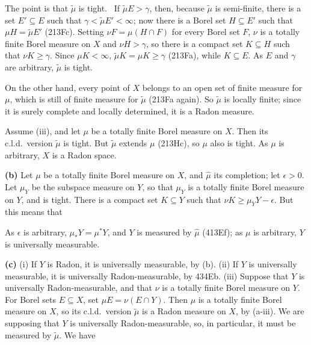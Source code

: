 {\medskip

 The point is that $\tilde\mu$ is tight.
\Prf\ If
$\tilde\mu E>\gamma$, then, because $\tilde\mu$ is semi-finite, there is
a set $E'\subseteq E$ such that $\gamma<\tilde\mu E'<\infty$;  now there
is a Borel set $H\subseteq E'$ such that $\mu H=\tilde\mu E'$ (213Fc).
Setting $\nu F=\mu(H\cap F)$ for every Borel set $F$, $\nu$ is a totally
finite Borel measure on $X$ and $\nu H>\gamma$, so there is a compact
set $K\subseteq H$ such that $\nu K\ge\gamma$.   Since
$\mu K<\infty$, $\tilde\mu K=\mu K\ge\gamma$ (213Fa), while
$K\subseteq E$.   As $E$ and $\gamma$ are arbitrary, $\tilde\mu$ is tight.\ \Qed

On the other hand, every point of $X$ belongs to an open set of finite
measure for $\mu$, which is still of finite measure for $\tilde\mu$
(213Fa again).   So $\tilde\mu$ is locally finite;  since it is surely
complete and locally determined, it is a Radon measure.

\medskip

 Assume (iii), and let $\mu$ be a totally
finite Borel measure on $X$.   Then its c.l.d.\ version $\tilde\mu$ is
tight.   But $\tilde\mu$
extends $\mu$ (213Hc), so $\mu$ also is tight.   As $\mu$ is arbitrary,
$X$ is a Radon space.

\medskip

{\bf (b)} Let $\mu$ be a totally finite Borel measure on $X$, and
$\hat\mu$ its completion;  let $\epsilon>0$.   Let $\mu_Y$ be the
subspace measure on $Y$, so that $\mu_Y$ is a totally finite Borel
measure on $Y$, and is tight.
There is a compact set $K\subseteq Y$ such that
$\nu K\ge\mu_YY-\epsilon$.   But this means that


\noindent As $\epsilon$ is arbitrary, $\mu_*Y=\mu^*Y$, and $Y$ is
measured by $\hat\mu$ (413Ef);  as $\mu$ is
arbitrary, $Y$ is universally measurable.

\medskip

{\bf (c)} (i) If $Y$ is Radon, it is universally measurable, by
(b).   (ii) If $Y$ is universally measurable, it is universally
Radon-measurable, by 434Eb.  (iii) Suppose that $Y$ is universally
Radon-measurable, and that $\nu$
is a totally finite Borel measure on $Y$.   For Borel sets
$E\subseteq X$, set $\mu E=\nu(E\cap Y)$.   Then $\mu$ is a totally
finite Borel
measure on $X$, so its c.l.d.\ version $\tilde\mu$ is a Radon measure on
$X$, by (a-iii).
We are supposing that $Y$ is universally Radon-measurable, so, in
particular, it must be measured by $\tilde\mu$.   We have

}
